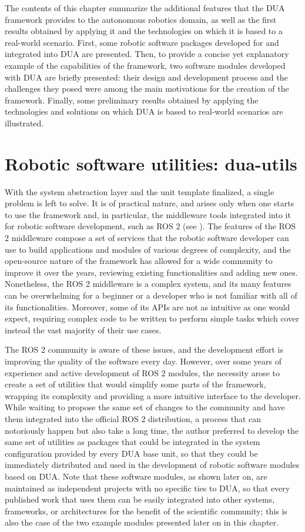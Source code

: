 The contents of this chapter summarize the additional features that the DUA framework provides to the autonomous robotics domain, as well as the first results obtained by applying it and the technologies on which it is based to a real-world scenario. First, some robotic software packages developed for and integrated into DUA are presented. Then, to provide a concise yet explanatory example of the capabilities of the framework, two software modules developed with DUA are briefly presented: their design and development process and the challenges they posed were among the main motivations for the creation of the framework. Finally, some preliminary results obtained by applying the technologies and solutions on which DUA is based to real-world scenarios are illustrated.

\section{Robotic software utilities: dua-utils}
\label{sec:dua-utils}
With the system abstraction layer and the unit template finalized, a single problem is left to solve. It is of practical nature, and arises only when one starts to use the framework and, in particular, the middleware tools integrated into it for robotic software development, such as ROS 2 (see ). The features of the ROS 2 middleware compose a set of services that the robotic software developer can use to build applications and modules of various degrees of complexity, and the open-source nature of the framework has allowed for a wide community to improve it over the years, reviewing existing functionalities and adding new ones. Nonetheless, the ROS 2 middleware is a complex system, and its many features can be overwhelming for a beginner or a developer who is not familiar with all of its functionalities. Moreover, some of its APIs are not as intuitive as one would expect, requiring complex code to be written to perform simple tasks which cover instead the vast majority of their use cases.

The ROS 2 community is aware of these issues, and the development effort is improving the quality of the software every day. However, over some years of experience and active development of ROS 2 modules, the necessity arose to create a set of utilities that would simplify some parts of the framework, wrapping its complexity and providing a more intuitive interface to the developer. While waiting to propose the same set of changes to the community and have them integrated into the official ROS 2 distribution, a process that can notoriously happen but also take a long time, the author preferred to develop the same set of utilities as packages that could be integrated in the system configuration provided by every DUA base unit, so that they could be immediately distributed and used in the development of robotic software modules based on DUA. Note that these software modules, as shown later on, are maintained as independent projects with no specific ties to DUA, so that every published work that uses them can be easily integrated into other systems, frameworks, or architectures for the benefit of the scientific community; this is also the case of the two example modules presented later on in this chapter.

